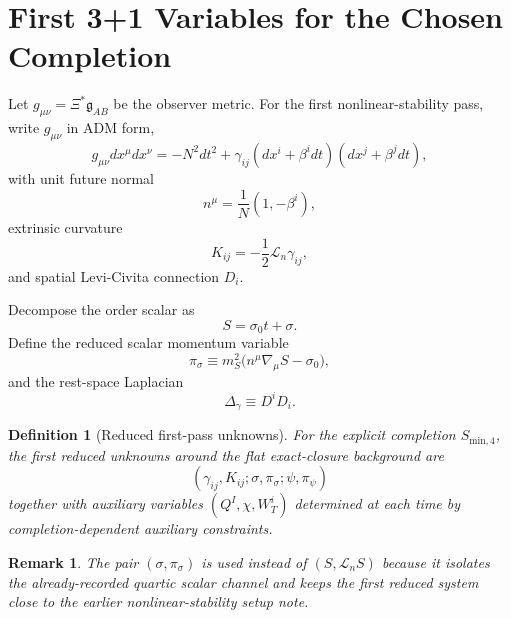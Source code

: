 \documentclass[11pt]{article}
\newcommand{\BridgeMetric}{\mathfrak{g}}
\newcommand{\Ell}{\mathcal{L}}
\newtheorem{definition}{Definition}
\newtheorem{remark}{Remark}
\begin{document}
\section{First 3+1 Variables for the Chosen Completion}

Let \(g_{\mu\nu}=\Xi^*\BridgeMetric_{AB}\) be the observer metric. For the first nonlinear-stability pass, write \(g_{\mu\nu}\) in ADM form,
\begin{equation}
g_{\mu\nu}dx^\mu dx^\nu
=
-N^2dt^2
+ \gamma_{ij}(dx^i+\beta^idt)(dx^j+\beta^jdt),
\label{eq:ADM}
\end{equation}
with unit future normal
\begin{equation}
n^\mu = \frac{1}{N}(1,-\beta^i),
\label{eq:normal}
\end{equation}
extrinsic curvature
\begin{equation}
K_{ij}=-\frac{1}{2}\Ell_n\gamma_{ij},
\label{eq:Kij}
\end{equation}
and spatial Levi-Civita connection \(D_i\).

Decompose the order scalar as
\begin{equation}
S=\sigma_0 t+\sigma.
\label{eq:Sdecomp}
\end{equation}
Define the reduced scalar momentum variable
\begin{equation}
\pi_\sigma
\equiv
m_S^2\bigl(n^\mu\nabla_\mu S-\sigma_0\bigr),
\label{eq:pisigma}
\end{equation}
and the rest-space Laplacian
\begin{equation}
\Delta_\gamma \equiv D^iD_i.
\label{eq:Deltagamma}
\end{equation}

\begin{definition}[Reduced first-pass unknowns]
For the explicit completion \(S_{\mathrm{min},4}\), the first reduced unknowns around the flat exact-closure background are
\begin{equation}
(\gamma_{ij},K_{ij};\sigma,\pi_\sigma;\psi,\pi_\psi)
\label{eq:reducedunknowns}
\end{equation}
together with auxiliary variables \((Q^I,\chi,W_T^i)\) determined at each time by completion-dependent auxiliary constraints.
\end{definition}

\begin{remark}
The pair \((\sigma,\pi_\sigma)\) is used instead of \((S,\Ell_n S)\) because it isolates the already-recorded quartic scalar channel and keeps the first reduced system close to the earlier nonlinear-stability setup note.
\end{remark}
\end{document}
